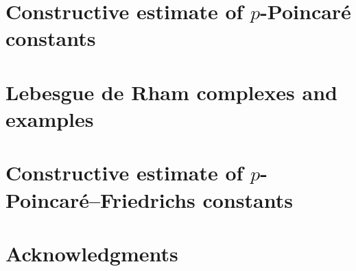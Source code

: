 \documentclass[a4paper]{article}
\begin{document}
\section{Constructive estimate of $p$-Poincar\'e constants}


\section{Lebesgue de Rham complexes and examples}
\section{Constructive estimate of $p$-Poincar\'e--Friedrichs constants}

\section*{Acknowledgments}
\end{document}
